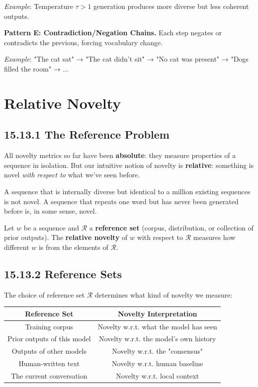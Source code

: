 \textit{Example}: Temperature $\tau > 1$ generation produces more diverse but less coherent outputs.

\textbf{Pattern E: Contradiction/Negation Chains.}
Each step negates or contradicts the previous, forcing vocabulary change.

\textit{Example}: "The cat sat" → "The cat didn't sit" → "No cat was present" → "Dogs filled the room" → ...



\section{Relative Novelty}

\subsection{15.13.1 The Reference Problem}

All novelty metrics so far have been \textbf{absolute}: they measure properties of a sequence in isolation. But our intuitive notion of novelty is \textbf{relative}: something is novel \textit{with respect to} what we've seen before.

A sequence that is internally diverse but identical to a million existing sequences is not novel. A sequence that repeats one word but has never been generated before is, in some sense, novel.

\begin{definition}
Let $w$ be a sequence and $\mathcal{R}$ a \textbf{reference set} (corpus, distribution, or collection of prior outputs). The \textbf{relative novelty} of $w$ with respect to $\mathcal{R}$ measures how different $w$ is from the elements of $\mathcal{R}$.
\end{definition}

\subsection{15.13.2 Reference Sets}

The choice of reference set $\mathcal{R}$ determines what kind of novelty we measure:

\begin{center}
\begin{tabular}{cc}
\toprule
Reference Set & Novelty Interpretation \\
\midrule
Training corpus & Novelty w.r.t. what the model has seen \\
Prior outputs of this model & Novelty w.r.t. the model's own history \\
Outputs of other models & Novelty w.r.t. the "consensus" \\
Human-written text & Novelty w.r.t. human baseline \\
The current conversation & Novelty w.r.t. local context \\
\bottomrule
\end{tabular}
\end{center}

